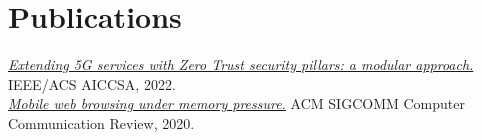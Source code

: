 \documentclass[letterpaper,10pt]{article}
\begin{document}
\section{Publications}
\href{https://doi.org/10.1109/AICCSA56895.2022.10017774}{\textit{Extending 5G services with Zero Trust security pillars: a modular approach.}} IEEE/ACS AICCSA, 2022.\\
\href{https://cs.brown.edu/people/tab/papers/CCR20.pdf}{\textit{Mobile web browsing under memory pressure.}} ACM SIGCOMM Computer Communication Review, 2020.
\end{document}
